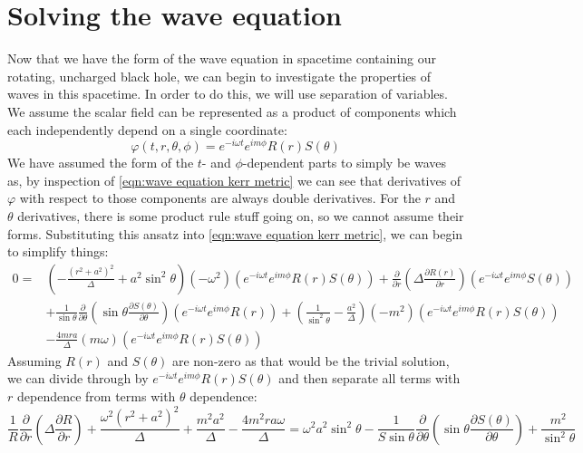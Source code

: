 \documentclass[11pt]{article}
\numberwithin{equation}{section}
\numberwithin{figure}{section}
\numberwithin{table}{section}
\begin{document}
\section{Solving the wave equation}\label{sec:Solving the wave equation}
\par Now that we have the form of the wave equation in spacetime containing our rotating, uncharged black hole, we can begin to investigate the properties of waves in this spacetime. In order to do this, we will use separation of variables. We assume the scalar field can be represented as a product of components which each independently depend on a single coordinate:
\begin{equation}
    \varphi(t,r,\theta,\phi)=e^{-i\omega t}e^{im\phi}R(r)S(\theta)
    \label{eqn:sep of variables ansatz}
\end{equation}
We have assumed the form of the $t$- and $\phi$-dependent parts to simply be waves as, by inspection of \cref{eqn:wave equation kerr metric} we can see that derivatives of $\varphi$ with respect to those components are always double derivatives. For the $r$ and $\theta$ derivatives, there is some product rule stuff going on, so we cannot assume their forms. Substituting this ansatz into \cref{eqn:wave equation kerr metric}, we can begin to simplify things:
\begin{align*}
    0=&\left(-\frac{(r^2+a^2)^2}{\Delta}+a^2\sin^2\theta\right)(-\omega^2)(e^{-i\omega t}e^{im\phi}R(r)S(\theta))+\frac{\partial}{\partial r}\left(\Delta\frac{\partial R(r)}{\partial r}\right)(e^{-i\omega t}e^{im\phi}S(\theta))\\&+\frac{1}{\sin\theta}\frac{\partial}{\partial\theta}\left(\sin\theta\frac{\partial S(\theta)}{\partial\theta}\right)(e^{-i\omega t}e^{im\phi}R(r))+\left(\frac{1}{\sin^2\theta}-\frac{a^2}{\Delta}\right)(-m^2)(e^{-i\omega t}e^{im\phi}R(r)S(\theta))\\&-\frac{4mra}{\Delta}(m\omega)(e^{-i\omega t}e^{im\phi}R(r)S(\theta))
\end{align*}
Assuming $R(r)$ and $S(\theta)$ are non-zero as that would be the trivial solution, we can divide through by $e^{-i\omega t}e^{im\phi}R(r)S(\theta)$ and then separate all terms with $r$ dependence from terms with $\theta$ dependence:
\begin{equation*}
    \frac{1}{R}\frac{\partial}{\partial r}\left(\Delta\frac{\partial R}{\partial r}\right)+\frac{\omega^2(r^2+a^2)^2}{\Delta}+\frac{m^2a^2}{\Delta}-\frac{4m^2ra\omega}{\Delta}=\omega^2a^2\sin^2\theta-\frac{1}{S\sin\theta}\frac{\partial}{\partial\theta}\left(\sin\theta\frac{\partial S(\theta)}{\partial\theta}\right)+\frac{m^2}{\sin^2\theta}
\end{equation*}
\end{document}
